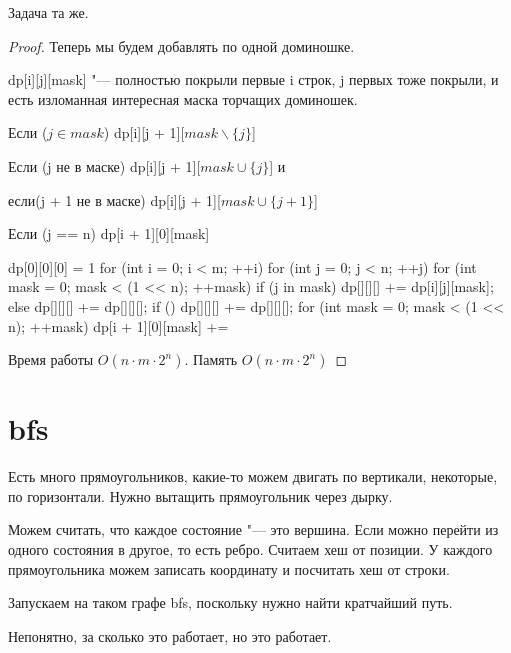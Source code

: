 Задача та же.
\begin{proof}
Теперь мы будем добавлять по одной доминошке.  

dp[i][j][mask] "--- полностью покрыли первые i строк, j первых тоже покрыли, и есть изломанная интересная маска торчащих доминошек.

Если ($j \in mask$) dp[i][j + 1][$mask \smallsetminus \{j\}$]

Если (j не в маске) dp[i][j + 1][$mask \cup \{j\}$] и 

если(j + 1 не в маске) dp[i][j + 1][$mask \cup \{j + 1\}$]

Если (j == n) dp[i + 1][0][mask]

\begin{cppcode}
dp[0][0][0] = 1
for (int i = 0; i < m; ++i) {
    for (int j = 0; j < n; ++j) {
        for (int mask = 0; mask < (1 << n); ++mask) {
            if (j in mask) {
                dp[][][] += dp[i][j][mask];
            } else {
                dp[][][] += dp[][][];
                if () {
                    dp[][][] += dp[][][];
                }
            } 
        }
    }
    for (int mask = 0; mask < (1 << n); ++mask) {
        dp[i + 1][0][mask] += 
    }
}
\end{cppcode}

Время работы $O(n \cdot m \cdot 2^n)$.
Память $O(n \cdot m \cdot 2^n)$
\end{proof}
\section{bfs}
Есть много прямоугольников, какие-то можем двигать по вертикали, некоторые, по горизонтали. Нужно вытащить прямоугольник через дырку. 

Можем считать, что каждое состояние "--- это вершина. Если можно перейти из одного состояния в другое, то есть ребро. 
Считаем хеш от позиции. У каждого прямоугольника можем записать координату и посчитать хеш от строки. 

Запускаем на таком графе bfs, поскольку нужно найти кратчайший путь. 

Непонятно, за сколько это работает, но это работает.